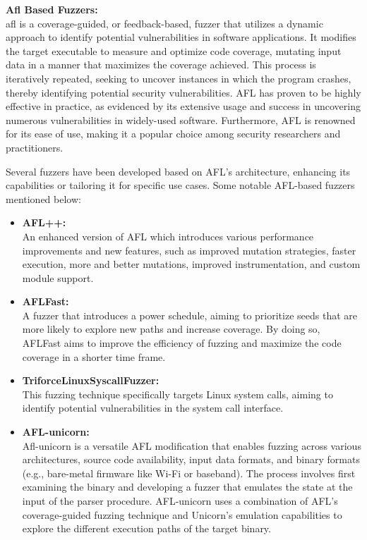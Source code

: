 \textbf{Afl Based Fuzzers:}\\
\acrlong{afl} is a coverage-guided, or feedback-based, fuzzer that utilizes a
dynamic approach to identify potential vulnerabilities in software applications.
It modifies the target executable to measure and optimize code coverage,
mutating input data in a manner that maximizes the coverage achieved.
This process is iteratively repeated, seeking to uncover instances in
which the program crashes, thereby identifying potential security vulnerabilities.
AFL has proven to be highly effective in practice, as evidenced by its extensive
usage and success in uncovering numerous vulnerabilities in widely-used software.
Furthermore, AFL is renowned for its ease of use, making it a popular choice
among security researchers and practitioners\cite{american20:online}\cite{fuzzinga40:online}.

Several fuzzers have been developed based on AFL's architecture, enhancing its
capabilities or tailoring it for specific use cases. Some notable AFL-based
fuzzers mentioned below:

\begin{itemize}
\item \textbf{AFL++:\cite{257204}\cite{GitHubAF78:online}} \\
An enhanced version of AFL which
introduces various performance improvements and new features, such as improved mutation strategies,
faster execution, more and better mutations, improved instrumentation, and custom module support.
\item \textbf{AFLFast:\cite{GitHubmb97:online}} \\
A fuzzer that introduces a power schedule, aiming to prioritize
seeds that are more likely to explore new paths and increase coverage.
By doing so, AFLFast aims to improve the efficiency of fuzzing and maximize
the code coverage in a shorter time frame\cite{bohme2016coverage}.
\item \textbf{TriforceLinuxSyscallFuzzer:\cite{GitHubnc62:online}} \\
This fuzzing technique specifically targets Linux system calls,
aiming to identify potential vulnerabilities in the system call interface.
\item \textbf{AFL-unicorn:\cite{GitHubBa48:online}} \\
Afl-unicorn is a versatile AFL modification that enables fuzzing across various architectures,
source code availability, input data formats, and binary formats (e.g., bare-metal firmware like Wi-Fi or baseband).
The process involves first examining the binary and developing a fuzzer that emulates the state at
the input of the parser procedure. AFL-unicorn uses a combination of AFL's coverage-guided fuzzing
technique and Unicorn's emulation capabilities to explore the different execution paths
of the target binary\cite{aflunico82:online}.
\end{itemize}
